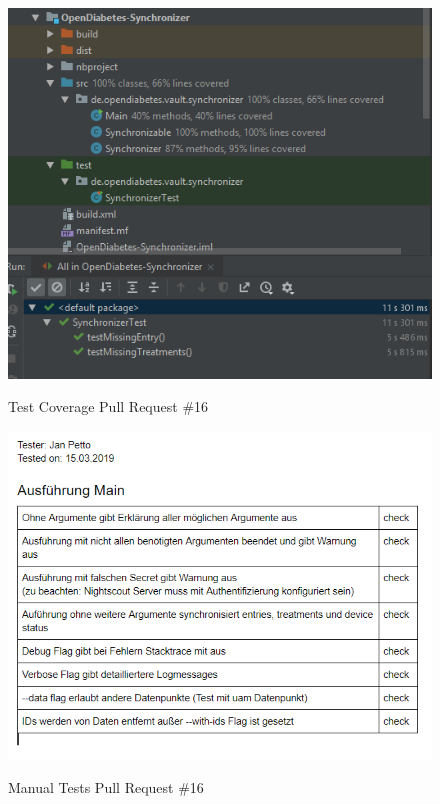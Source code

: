 \documentclass[accentcolor=tud0b,12pt,paper=a4]{tudreport}
\begin{document}
\begin{figure}[h]
\centering
\caption{Test Coverage Pull Request \#16}
\includegraphics[width=\textwidth,height=\textheight,keepaspectratio]{pr-cov-16}
\label{pr-cov:16}
\end{figure}

\begin{figure}[h]
\centering
\caption{Manual Tests Pull Request \#16}
\includegraphics[width=\textwidth,height=\textheight,keepaspectratio]{pr-tests-16}
\label{pr-tests:16}
\end{figure}
\end{document}
